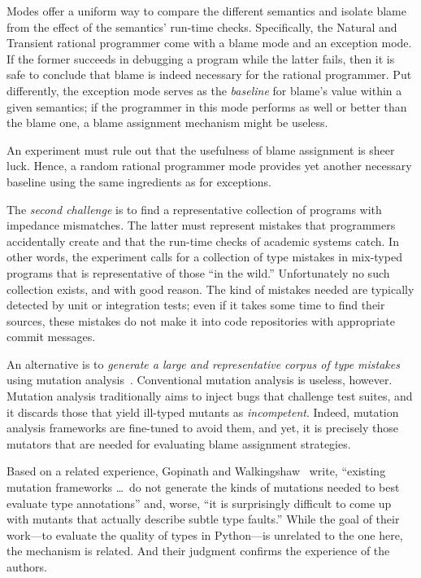 Modes offer a uniform way to compare the different semantics and  isolate
blame from the effect of the semantics' run-time checks. Specifically, the Natural and
Transient rational programmer come with a blame mode and an exception
mode. If the former succeeds in debugging a program while the latter
fails, then it is safe to conclude that blame is indeed necessary for the
rational programmer. Put differently, the exception mode serves as the
{\em baseline\/} for blame's value within a given semantics; if the
programmer in this mode performs as well or better than the  blame one, a blame assignment
mechanism might be useless.

An experiment must rule out that the usefulness of blame assignment is sheer
luck.  Hence, a random rational programmer mode provides yet another necessary
baseline using the same ingredients as for exceptions.

The {\em second challenge\/} is to find a representative collection of
programs with impedance mismatches. The latter must represent mistakes that programmers
accidentally create and that the run-time checks of academic systems catch. In
other words, the experiment calls for a collection of type mistakes in
mix-typed programs that is representative of those ``in the wild.''
Unfortunately no such collection exists, and with good reason. The kind of
mistakes needed are typically detected by unit or integration tests; even if it
takes some time to find their sources, these mistakes do not make it into code
repositories with appropriate commit messages.

An alternative is to {\em generate a large and representative corpus of type
mistakes \/} using mutation analysis~\citep{lipton1971fault, demillo1978hints,
jia2011analysis}. Conventional mutation analysis is useless, however.  Mutation
analysis traditionally aims to inject bugs that challenge test suites, and it
discards those that yield ill-typed mutants as \emph{incompetent}. Indeed,
mutation analysis frameworks are fine-tuned to avoid them, and yet, it is
precisely those mutators that are needed for evaluating blame assignment strategies.

Based on a related experience, Gopinath and Walkingshaw~\citep{gw-mutation} write,
``existing mutation frameworks \ldots\ do not generate the kinds of mutations
needed to best evaluate type annotations'' and, worse, ``it is surprisingly
difficult to come up with mutants that actually describe subtle type faults.''
While the goal of their work---to evaluate the quality of types in
Python---is unrelated to the one here, the mechanism is related. And their
judgment confirms the experience of the authors. 

